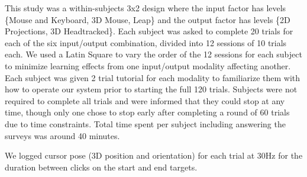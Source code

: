 This study was a within-subjects 3x2 design where the input factor has levels
\{Mouse and Keyboard, 3D Mouse, Leap\} and the output factor has levels \{2D
Projections, 3D Headtracked\}.  Each subject was asked to complete 20 trials
for each of the six input/output combination, divided into 12 sessions of 10
trials each.  We used a Latin Square to vary the order of the 12 sessions for
each subject to minimize learning effects from one input/output modality
affecting another.  Each subject was given 2 trial tutorial for each modality
to familiarize them with how to operate our system prior to starting the full
120 trials.  Subjects were not required to complete all trials and were
informed that they could stop at any time, though only one chose to stop early
after completing a round of 60 trials due to time constraints.  Total time
spent per subject including answering the surveys was around 40 minutes.

We logged cursor pose (3D position and orientation) for each trial at 30Hz for
the duration between clicks on the start and end targets.

